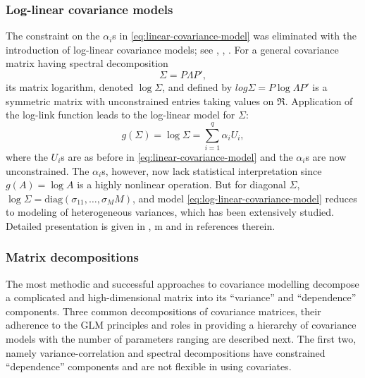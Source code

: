 \documentclass[12pt]{article}
\theoremstyle{definition}
\begin{document}


\subsubsection{Log-linear covariance models}

The constraint on the $\alpha_i$s in \ref{eq:linear-covariance-model} was eliminated with the introduction of log-linear covariance models; see \citet{chiu1996matrix},  \citet{pinheiro1996unconstrained}, . For a general covariance matrix having spectral decomposition
\begin{equation}
\Sigma = P \Lambda P',
\end{equation}
\noindent
its matrix logarithm, denoted $\log\Sigma$, and defined by $log \Sigma = P \log\Lambda P'$ is a symmetric matrix with unconstrained entries taking values on $\Re$. Application of the log-link function leads to the log-linear model for $\Sigma$:
\begin{equation} \label{eq:log-linear-covariance-model}
g\left(\Sigma\right)  = \log\Sigma  = \sum_{i = 1}^q \alpha_i U_i, 
\end{equation}
\noindent
where the $U_i$s are as before in \ref{eq:linear-covariance-model} and the $\alpha_i$s are now unconstrained. The $\alpha_i$s, however, now lack statistical interpretation since $g\left(A\right) = \log A$ is a highly nonlinear operation. But for diagonal $\Sigma$, $\log \Sigma = \mbox{diag}\left(\sigma_{11},\dots, \sigma_MM\right)$, and model \ref{eq:log-linear-covariance-model} reduces to modeling of heterogeneous variances, which has been extensively studied. Detailed presentation is given in \citet{carroll1988transformation}, \citet{verbyla1993modelling}m and in references therein.



\subsubsection{Matrix decompositions} \label{chapter-1-matrix-decompositions}
The most methodic and successful approaches to covariance modelling decompose a complicated and high-dimensional matrix into its “variance” and “dependence” components. Three common decompositions of covariance matrices, their adherence to the GLM principles and roles in providing a hierarchy of covariance models with the number of parameters ranging are described next. The first two, namely variance-correlation and spectral decompositions have constrained “dependence” components and are not flexible in using covariates.
\end{document}
